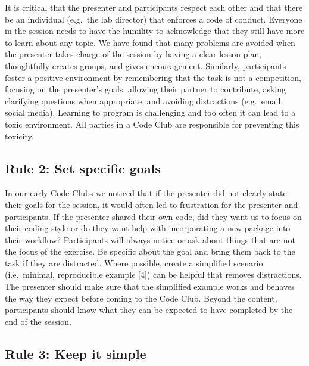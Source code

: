 \documentclass[
  11pt,
]{article}
\begin{document}
It is critical that the presenter and participants respect each other
and that there be an individual (e.g.~the lab director) that enforces a
code of conduct. Everyone in the session needs to have the humility to
acknowledge that they still have more to learn about any topic. We have
found that many problems are avoided when the presenter takes charge of
the session by having a clear lesson plan, thoughtfully creates groups,
and gives encouragement. Similarly, participants foster a positive
environment by remembering that the task is not a competition, focusing
on the presenter's goals, allowing their partner to contribute, asking
clarifying questions when appropriate, and avoiding distractions
(e.g.~email, social media). Learning to program is challenging and too
often it can lead to a toxic environment. All parties in a Code Club are
responsible for preventing this toxicity.

\hypertarget{rule-2-set-specific-goals}{%
\subsection{Rule 2: Set specific
goals}\label{rule-2-set-specific-goals}}

In our early Code Clubs we noticed that if the presenter did not clearly
state their goals for the session, it would often led to frustration for
the presenter and participants. If the presenter shared their own code,
did they want us to focus on their coding style or do they want help
with incorporating a new package into their workflow? Participants will
always notice or ask about things that are not the focus of the
exercise. Be specific about the goal and bring them back to the task if
they are distracted. Where possible, create a simplified scenario
(i.e.~minimal, reproducible example {[}4{]}) can be helpful that removes
distractions. The presenter should make sure that the simplified example
works and behaves the way they expect before coming to the Code Club.
Beyond the content, participants should know what they can be expected
to have completed by the end of the session.

\hypertarget{rule-3-keep-it-simple}{%
\subsection{Rule 3: Keep it simple}\label{rule-3-keep-it-simple}}
\end{document}
